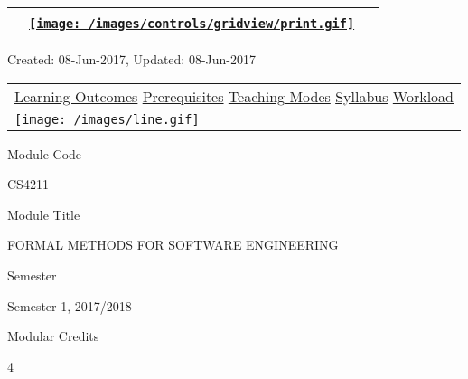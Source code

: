 \hypertarget{ctl00_ctl00_ContentPlaceHolder1_ContentPlaceHolder1_UP}{}
\hypertarget{contentstart}{}
\hypertarget{ctl00_ctl00_ContentPlaceHolder1_ContentPlaceHolder1_pnlMain}{}
\begin{longtable}[]{@{}ll@{}}
\toprule
&
{\href{javascript:PrintThisPage();}{\texttt{[image: /images/controls/gridview/print.gif]}}~~}\tabularnewline
\bottomrule
\end{longtable}

\protect\hypertarget{ctl00_ctl00_ContentPlaceHolder1_ContentPlaceHolder1_LV_UpdateInfo_ctrl0_txtDate}{}{Created:
08-Jun-2017, Updated: 08-Jun-2017}

\begin{longtable}[]{@{}l@{}}
\toprule
\protect\hypertarget{ctl00_ctl00_ContentPlaceHolder1_ContentPlaceHolder1_lblSectionTop}{}{\protect\hyperlink{Learningux5cux2520Outcomes}{Learning
Outcomes} \textbar{} \protect\hyperlink{Prerequisites}{Prerequisites}
\textbar{} \protect\hyperlink{Teachingux5cux2520Modes}{Teaching Modes}
\textbar{} \protect\hyperlink{Syllabus}{Syllabus} \textbar{}
\protect\hyperlink{Workload}{Workload}}\tabularnewline
\texttt{[image: /images/line.gif]}\tabularnewline
\bottomrule
\end{longtable}

\hypertarget{ctl00_ctl00_ContentPlaceHolder1_ContentPlaceHolder1_LV_itemPlaceholderContainer}{}
\protect\hypertarget{ctl00_ctl00_ContentPlaceHolder1_ContentPlaceHolder1_LV_ctrl0_txtCode}{}{Module
Code}

\protect\hypertarget{ctl00_ctl00_ContentPlaceHolder1_ContentPlaceHolder1_LV_ctrl0_lcCode}{}{CS4211}

\protect\hypertarget{ctl00_ctl00_ContentPlaceHolder1_ContentPlaceHolder1_LV_ctrl0_lcCourse}{}{Module
Title}

\protect\hypertarget{ctl00_ctl00_ContentPlaceHolder1_ContentPlaceHolder1_LV_ctrl0_lcCourseName}{}{FORMAL
METHODS FOR SOFTWARE ENGINEERING}

\protect\hypertarget{ctl00_ctl00_ContentPlaceHolder1_ContentPlaceHolder1_LV_ctrl0_lcSemester}{}{Semester}

\protect\hypertarget{ctl00_ctl00_ContentPlaceHolder1_ContentPlaceHolder1_LV_ctrl0_lcSem}{}{Semester
1, 2017/2018}

\protect\hypertarget{ctl00_ctl00_ContentPlaceHolder1_ContentPlaceHolder1_LV_ctrl0_lcModCredit}{}{Modular
Credits}

\protect\hypertarget{ctl00_ctl00_ContentPlaceHolder1_ContentPlaceHolder1_LV_ctrl0_lcModC}{}{4}

